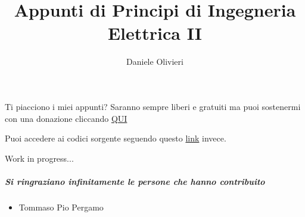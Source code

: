 \documentclass[a4paper,11pt]{scrartcl}
\title{Appunti di Principi di Ingegneria Elettrica II}
\author{Daniele Olivieri}
\date{}
\begin{document}
\maketitle
Ti piacciono i miei appunti? Saranno sempre liberi e gratuiti ma puoi sostenermi con una donazione cliccando \href{https://www.paypal.com/donate?hosted_button_id=7KELP768NJSYW}{QUI}

Puoi accedere ai codici sorgente seguendo questo \href{https://github.com/FlashNoob98/appunti_principi_II_unina}{link} invece.
\setcounter{tocdepth}{2}
\tableofcontents
\setlength\arrayrulewidth{1.2pt} %



















Work in progress...
\subparagraph{Si ringraziano infinitamente le persone che hanno contribuito}
\begin{itemize}
\item Tommaso Pio Pergamo
\end{itemize}
\end{document}
